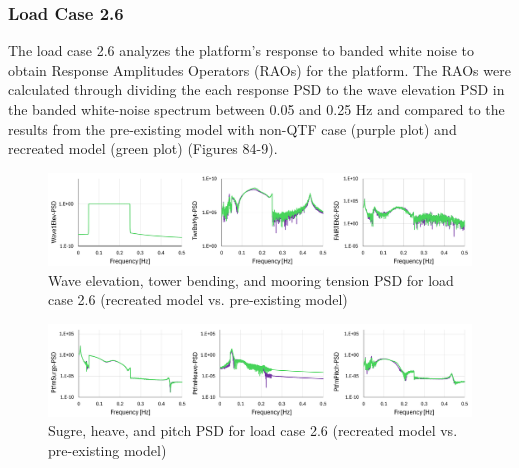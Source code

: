 \documentclass[a4paper, 11pt]{article}
\begin{document}
\subsubsection{Load Case 2.6}

\hspace*{0.5cm}The load case 2.6 analyzes the platform's response to banded white noise to obtain Response Amplitudes Operators (RAOs) for the platform. The RAOs were calculated through dividing the each response PSD to the wave elevation PSD in the banded white-noise spectrum between 0.05 and 0.25 Hz and compared to the results from the pre-existing model with non-QTF case (purple plot) and recreated model (green plot) (Figures 84-9).

\begin{figure}[H]
    \centering
    \includegraphics[width=1\textwidth]{wave_twr_ten_psd_mine.png}
    \caption{\small Wave elevation, tower bending, and mooring tension PSD for load case 2.6 (recreated model vs. pre-existing model)}
    \label{fig:w_t_t_p_mine_recreated}
\end{figure}

\begin{figure}[H]
    \centering
    \includegraphics[width=1\textwidth]{sur_hea_pit_psd_mine.png}
    \caption{\small Sugre, heave, and pitch PSD for load case 2.6 (recreated model vs. pre-existing model)}
    \label{fig:s_h_p_p_mine_recreated}
\end{figure}
\end{document}
